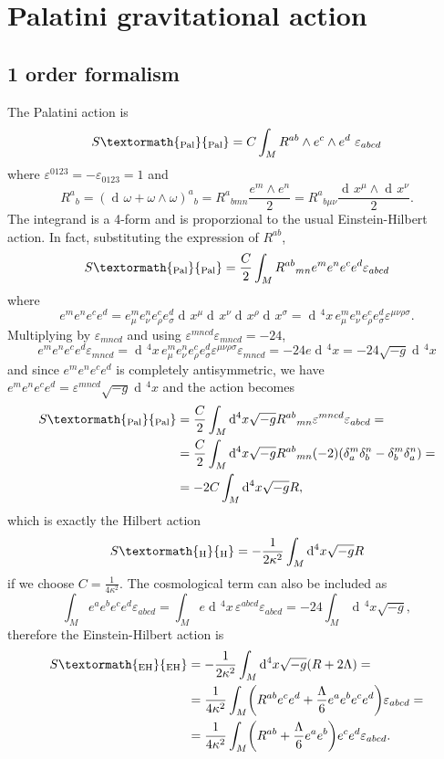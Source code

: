 \documentclass[a4paper,12pt]{book}
\newcommand{\ped}[1]{\textormath{\textsubscript{#1}}{_{\mathrm{#1}}}}
\newcommand{\ap}[1]{\textormath{\textsuperscript{#1}}{^{\mathrm{#1}}}}
\newcommand{\dd}{\mathop{\mathrm{d}\!}{}}
\theoremstyle{definition}
\theoremstyle{remark}
\begin{document}
\section{Palatini gravitational action}
\subsection{1\ap{st} order formalism}
\label{subsec:pal1vierbein}
The Palatini action is 
\[S\ped{Pal}=C\int_MR^{ab}\wedge e^c\wedge e^d\ \varepsilon_{abcd}\]
where $\varepsilon^{0123}=-\varepsilon_{0123}=1$ and
\[R^a{}_b=(\dd\omega+\omega\wedge\omega)^a{}_b=R^a{}_{bmn}\frac{e^m\wedge e^n}{2}=R^a{}_{b\mu\nu}\frac{\dd x^\mu\wedge\dd x^\nu}{2}.\]
The integrand is a 4-form and is proporzional to the usual Einstein-Hilbert action. In fact, substituting the expression of $R^{ab}$,
\[S\ped{Pal}=\frac{C}{2}\int_MR^{ab}{}_{mn}e^me^ne^ce^d\varepsilon_{abcd}\]
where
\[e^me^ne^ce^d=e^m_\mu e^n_\nu e^c_\rho e^d_\sigma\dd x^\mu\dd x^\nu\dd x^\rho\dd x^\sigma=\dd^4x\,e^m_\mu e^n_\nu e^c_\rho e^d_\sigma \varepsilon^{\mu\nu\rho\sigma}.\]
Multiplying by $\varepsilon_{mncd}$ and using $\varepsilon^{mncd}\varepsilon_{mncd}=-24$,
\[e^me^ne^ce^d\varepsilon_{mncd}=\dd^4x\,e^m_\mu e^n_\nu e^c_\rho e^d_\sigma \varepsilon^{\mu\nu\rho\sigma}\varepsilon_{mncd}=-24e\dd^4 x=-24\sqrt{-g}\dd^4x\]
and since $e^me^ne^ce^d$ is completely antisymmetric, we have $e^me^ne^ce^d=\varepsilon^{mncd}\sqrt{-g}\dd^4x$ and the action becomes
\begin{align*}
S\ped{Pal}&=\frac{C}{2}\int_M\dd^4x\sqrt{-g}R^{ab}{}_{mn}\varepsilon^{mncd}\varepsilon_{abcd}=\\
&=\frac{C}{2}\int_M\dd^4x\sqrt{-g}R^{ab}{}_{mn}(-2)(\delta^m_a\delta^n_b-\delta^m_b\delta^n_a)=\\
&=-2C\int_M\dd^4x\sqrt{-g}R,
\end{align*}
which is exactly the Hilbert action
\[S\ped{H}=-\frac{1}{2\kappa^2}\int_M\dd^4x\sqrt{-g}R\]
if we choose $C=\frac{1}{4\kappa^2}$. The cosmological term can also be included as
\[\int_Me^ae^be^ce^d\varepsilon_{abcd}=\int_M e\dd^4x\,\varepsilon^{abcd}\varepsilon_{abcd}=-24\int_M\dd^4x\sqrt{-g},\]
therefore the Einstein-Hilbert action is
\begin{align}
\label{eqn:palatinieh}
S\ped{EH}&=-\frac{1}{2\kappa^2}\int_M\dd^4x\sqrt{-g}(R+2\Lambda)=\\
&=\frac{1}{4\kappa^2}\int_M\biggl(R^{ab}e^ce^d+\frac{\Lambda}{6}e^ae^be^ce^d\biggr)\varepsilon_{abcd}=\\
&=\frac{1}{4\kappa^2}\int_M\biggl(R^{ab}+\frac{\Lambda}{6}e^ae^b\biggr)e^ce^d\varepsilon_{abcd}.
\end{align}
\end{document}

